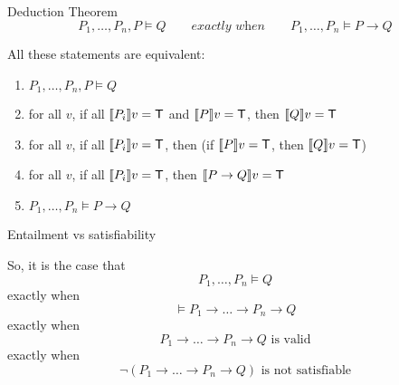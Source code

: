 \documentclass[xetex,aspectratio=169,14pt,hyperref={pdfpagelabels=true,pdflang={en-GB}}]{beamer}
\begin{document}
\begin{frame}
  {Deduction Theorem}
  \begin{displaymath}
    P_1, \ldots, P_n, P \models Q
    \qquad \textit{exactly when} \qquad
    P_1, \ldots, P_n \models P \to Q
  \end{displaymath}

  \bigskip

  All these statements are equivalent:
  \begin{enumerate}
  \item $P_1, \ldots, P_n, P \models Q$
  \item for all $v$, if all $\llbracket P_i \rrbracket v = \mathsf{T}$ and $\llbracket P \rrbracket v = \mathsf{T}$, then $\llbracket Q \rrbracket v = \mathsf{T}$
  \item for all $v$, if all $\llbracket P_i \rrbracket v = \mathsf{T}$, then (if $\llbracket P \rrbracket v = \mathsf{T}$, then $\llbracket Q \rrbracket v = \mathsf{T}$)
  \item for all $v$, if all $\llbracket P_i \rrbracket v = \mathsf{T}$, then $\llbracket P \to Q \rrbracket v = \mathsf{T}$
  \item $P_1, \ldots, P_n \models P \to Q$
  \end{enumerate}
\end{frame}

\begin{frame}
  {Entailment vs satisfiability}

  So, it is the case that
  \begin{displaymath}
    P_1,\dots,P_n \models Q
  \end{displaymath}
  exactly when
  \begin{displaymath}
    \models P_1 \to \dots \to P_n \to Q
  \end{displaymath}
  exactly when
  \begin{displaymath}
    P_1 \to \dots \to P_n \to Q \textrm{ is valid}
  \end{displaymath}
  exactly when
  \begin{displaymath}
    \lnot (P_1 \to \dots \to P_n \to Q) \textrm{ is not satisfiable}
  \end{displaymath}


\end{frame}
\end{document}
